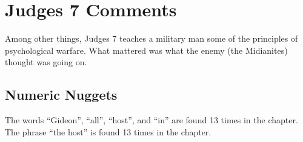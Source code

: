 \section{Judges 7 Comments}
Among other things, Judges 7 teaches a military man some of the principles of psychological warfare. What mattered was what the enemy (the Midianites) thought was going on.  

\subsection{Numeric Nuggets}
The words ``Gideon'', ``all'', ``host'', and ``in'' are found 13 times in the chapter. The phrase ``the host'' is found 13 times in the chapter.





